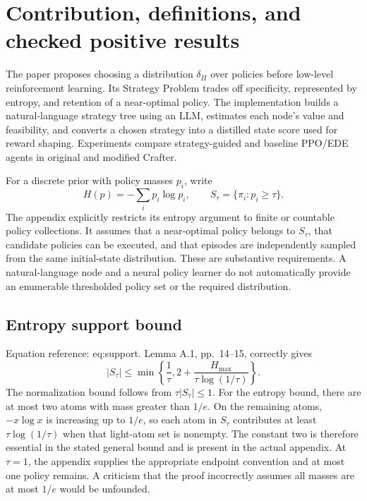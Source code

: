 \documentclass[10pt]{article}
\begin{document}
\section*{Contribution, definitions, and checked positive results}
The paper proposes choosing a distribution \(\delta_\Pi\) over policies before low-level reinforcement learning. Its Strategy Problem trades off specificity, represented by entropy, and retention of a near-optimal policy. The implementation builds a natural-language strategy tree using an LLM, estimates each node’s value and feasibility, and converts a chosen strategy into a distilled state score used for reward shaping. Experiments compare strategy-guided and baseline PPO/EDE agents in original and modified Crafter.\par
For a discrete prior with policy masses \(p_i\), write \[H(p)=-\sum_i p_i\log p_i,\qquad
 S_\tau=\{\pi_i:p_i\geq\tau\}.\] The appendix explicitly restricts its entropy argument to finite or countable policy collections. It assumes that a near-optimal policy belongs to \(S_\tau\), that candidate policies can be executed, and that episodes are independently sampled from the same initial-state distribution. These are substantive requirements. A natural-language node and a neural policy learner do not automatically provide an enumerable thresholded policy set or the required distribution.\par
\subsection*{Entropy support bound}
Equation reference: eq:support. Lemma A.1, pp. 14–15, correctly gives \[
 |S_\tau|\leq
 \min\left\{\frac{1}{\tau},
       2+\frac{H_{\max}}{\tau\log(1/\tau)}\right\}.\] The normalization bound follows from \(\tau|S_\tau|\leq1\). For the entropy bound, there are at most two atoms with mass greater than \(1/e\). On the remaining atoms, \(-x\log x\) is increasing up to \(1/e\), so each atom in \(S_\tau\) contributes at least \(\tau\log(1/\tau)\) when that light-atom set is nonempty. The constant two is therefore essential in the stated general bound and is present in the actual appendix. At \(\tau=1\), the appendix supplies the appropriate endpoint convention and at most one policy remains. A criticism that the proof incorrectly assumes all masses are at most \(1/e\) would be unfounded.\par
\end{document}
